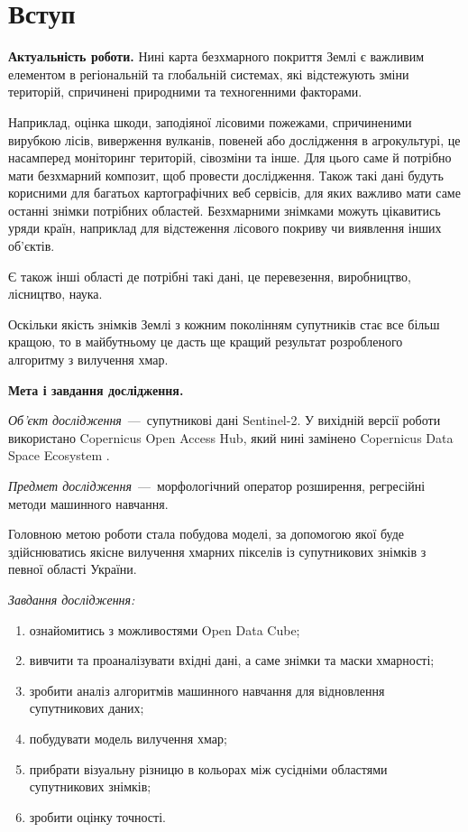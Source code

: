 \chapter*{Вступ} 

\textbf{Актуальність роботи.} Нині карта %
безхмарного покриття Землі є важливим %
елементом
в регіональній та глобальній системах, які %
відстежують зміни територій, спричинені
природними та техногенними факторами.

Наприклад, оцінка шкоди, заподіяної лісовими %
пожежами, спричиненими вирубкою лісів,
виверження вулканів, повеней або дослідження в %
агрокультурі, це насамперед моніторинг
територій, сівозміни та інше.  Для цього саме й %
потрібно мати безхмарний композит, щоб
провести дослідження.  Також такі дані будуть %
корисними для багатьох картографічних веб
сервісів, для яких важливо мати саме останні %
знімки потрібних областей.  Безхмарними
знімками можуть цікавитись уряди країн, %
наприклад для відстеження лісового покриву чи виявлення інших об'єктів.

Є також інші області де потрібні такі дані, це %
перевезення, виробництво, лісництво,
наука.

Оскільки якість знімків Землі з кожним %
поколінням супутників стає все більш кращою, то %
в
майбутньому це дасть ще кращий результат %
розробленого алгоритму з вилучення хмар.

\textbf{Мета і завдання дослідження.}

\textit{Об'єкт дослідження}~---~супутникові дані %
Sentinel-2.  У вихідній версії роботи
використано Copernicus Open Access Hub, який нині замінено %
Copernicus Data Space
Ecosystem \cite{ref11,ref16}.

\textit{Предмет дослідження}~---~морфологічний %
оператор розширення, регресійні методи
машинного навчання.

Головною метою роботи стала побудова моделі, за %
допомогою якої буде здійснюватись якісне
вилучення хмарних пікселів із супутникових %
знімків з певної області України.

\textit{Завдання дослідження:} \begin{enumerate}
	\item ознайомитись з можливостями Open Data Cube;

	\item вивчити та проаналізувати вхідні дані, а %
саме знімки та маски хмарності;

	\item зробити аналіз алгоритмів машинного %
навчання для відновлення супутникових
		даних;

	\item побудувати модель вилучення хмар;

	\item прибрати візуальну різницю в кольорах між %
сусідніми областями супутникових
		знімків;

	\item зробити оцінку точності.
\end{enumerate}

